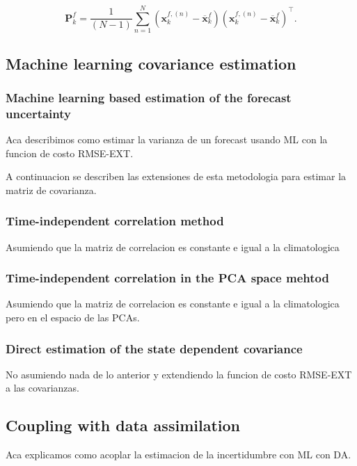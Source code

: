 \documentclass[num-refs]{wiley-article}
\renewcommand{\v}[1]{\ensuremath{\mathbf{#1}}}
\newcommand{\gv}[1]{\bm{#1}}
\begin{document}
\begin{equation}
\label{EQU:SIGMA}
\gv P^{f}_{k} = \frac{1}{(N-1)}\sum_{n=1}^{N} \left(\v x^{f,(n)}_{k}-\overline{\v x}^{f}_{k}\right)\left(\v x^{f,(n)}_{k}-\overline{\v x}^{f}_{k}\right)^\top .
\end{equation}


\subsection{Machine learning covariance estimation}

\subsubsection{Machine learning based estimation of the forecast uncertainty}

Aca describimos como estimar la varianza de un forecast usando ML con la funcion de costo RMSE-EXT. 

A continuacion se describen las extensiones de esta metodologia para estimar la matriz de covarianza.

\subsubsection{Time-independent correlation method}

Asumiendo que la matriz de correlacion es constante e igual a la climatologica

\subsubsection{Time-independent correlation in the PCA space mehtod}

Asumiendo que la matriz de correlacion es constante e igual a la climatologica pero en el espacio de las PCAs.

\subsubsection{Direct estimation of the state dependent covariance}

No asumiendo nada de lo anterior y extendiendo la funcion de costo RMSE-EXT a las covarianzas. 

\subsection{Coupling with data assimilation}

Aca explicamos como acoplar la estimacion de la incertidumbre con ML con DA.
\end{document}
